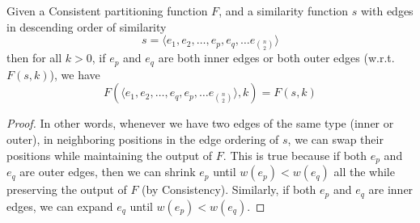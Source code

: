 \documentclass[twoside,11pt]{article}
\begin{document}
\begin{lemma} \label{swap}
Given a Consistent partitioning function $F$, and a similarity function $s$ with edges in descending order of similarity
$$s = \langle e_1, e_2, \ldots,e_{p},e_{q}, \ldots  e_{n \choose 2} \rangle$$
then for all $k>0$, if $e_p$ and $e_q$ are both inner edges or both outer edges (w.r.t. $F(s, k)$), we have
$$F(\langle e_1, e_2, \ldots,e_{q},e_{p}, \ldots  e_{n \choose 2} \rangle, k) = F(s, k)$$
\end{lemma}
\begin{proof}
In other words, whenever we have two edges of the same type (inner or outer), in neighboring positions in the edge ordering of $s$, we can swap their positions while maintaining the output of $F$. This is true because if both $e_p$ and $e_q$ are outer edges, then we can shrink $e_p$ until $w(e_p) < w(e_q)$ all the while preserving the output of $F$ (by Consistency). Similarly, if both $e_p$ and $e_q$ are inner edges, we can expand $e_q$ until $w(e_p) < w(e_q)$.
\end{proof}
\end{document}
